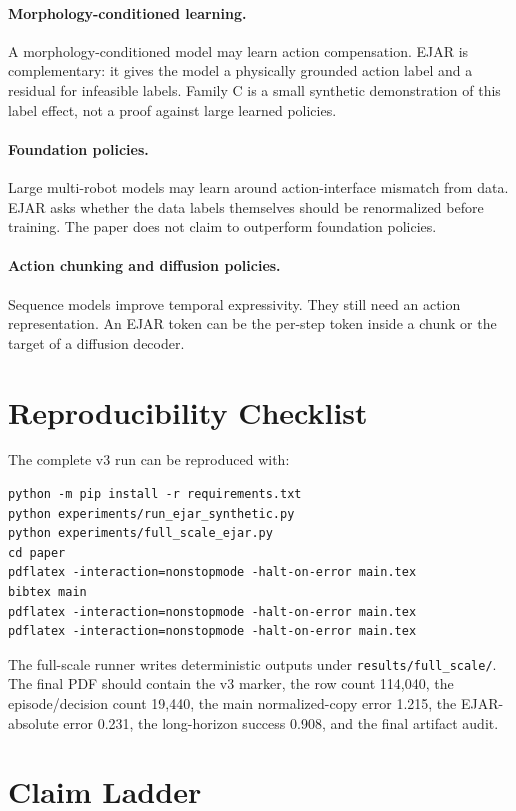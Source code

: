 \documentclass{article}
\begin{document}
\paragraph{Morphology-conditioned learning.}
A morphology-conditioned model may learn action compensation. EJAR is complementary: it gives the model a physically grounded action label and a residual for infeasible labels. Family C is a small synthetic demonstration of this label effect, not a proof against large learned policies.

\paragraph{Foundation policies.}
Large multi-robot models may learn around action-interface mismatch from data. EJAR asks whether the data labels themselves should be renormalized before training. The paper does not claim to outperform foundation policies.

\paragraph{Action chunking and diffusion policies.}
Sequence models improve temporal expressivity. They still need an action representation. An EJAR token can be the per-step token inside a chunk or the target of a diffusion decoder.

\section{Reproducibility Checklist}

The complete v3 run can be reproduced with:
\begin{verbatim}
python -m pip install -r requirements.txt
python experiments/run_ejar_synthetic.py
python experiments/full_scale_ejar.py
cd paper
pdflatex -interaction=nonstopmode -halt-on-error main.tex
bibtex main
pdflatex -interaction=nonstopmode -halt-on-error main.tex
pdflatex -interaction=nonstopmode -halt-on-error main.tex
\end{verbatim}

The full-scale runner writes deterministic outputs under \texttt{results/full\_scale/}. The final PDF should contain the v3 marker, the row count 114,040, the episode/decision count 19,440, the main normalized-copy error 1.215, the EJAR-absolute error 0.231, the long-horizon success 0.908, and the final artifact audit.

\section{Claim Ladder}
\end{document}

